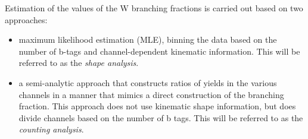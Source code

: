 Estimation of the values of the W branching fractions is carried out based on two approaches: 

\begin{itemize}
    \item maximum likelihood estimation (MLE), binning the data based on the number of b-tags and channel-dependent kinematic information. This will be referred to as the \emph{shape analysis}.
    \item a semi-analytic approach that constructs ratios of yields in the various channels in a manner that mimics a direct construction of the branching fraction.  This approach does not use kinematic shape information, but does divide channels based on the number of b tags. This will be referred to as the \emph{counting analysis}.
\end{itemize}




